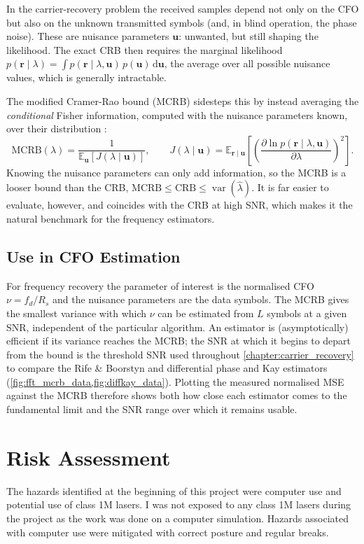 \documentclass[12pt,a4paper]{report}
\begin{document}
In the carrier-recovery problem the received samples depend not only on the CFO but also on the unknown transmitted symbols (and, in blind operation, the phase noise). These are nuisance parameters $\mathbf u$: unwanted, but still shaping the likelihood. The exact CRB then requires the marginal likelihood $p(\mathbf r\mid\lambda) = \int p(\mathbf r\mid\lambda,\mathbf u)\,p(\mathbf u)\,\mathrm d\mathbf u$, the average over all possible nuisance values, which is generally intractable.

The modified Cramer-Rao bound (MCRB) sidesteps this by instead averaging the \emph{conditional} Fisher information, computed with the nuisance parameters known, over their distribution \cite{Andrea1994}:
\begin{equation}
    \mathrm{MCRB}(\lambda) = \frac{1}{\mathbb E_{\mathbf u}\!\left[ J(\lambda\mid \mathbf u)\right]}, \qquad J(\lambda\mid\mathbf u) = \mathbb E_{\mathbf r\mid \mathbf u}\!\left[\left(\frac{\partial \ln p(\mathbf r\mid\lambda,\mathbf u)}{\partial\lambda}\right)^2\right].
\end{equation}
Knowing the nuisance parameters can only add information, so the MCRB is a looser bound than the CRB, $\mathrm{MCRB}\le\mathrm{CRB}\le\operatorname{var}(\hat\lambda)$. It is far easier to evaluate, however, and coincides with the CRB at high SNR, which makes it the natural benchmark for the frequency estimators.

\section{Use in CFO Estimation}
For frequency recovery the parameter of interest is the normalised CFO $\nu = f_d/R_s$ and the nuisance parameters are the data symbols. The MCRB gives the smallest variance with which $\nu$ can be estimated from $L$ symbols at a given SNR, independent of the particular algorithm. An estimator is (asymptotically) efficient if its variance reaches the MCRB; the SNR at which it begins to depart from the bound is the threshold SNR used throughout \cref{chapter:carrier_recovery} to compare the Rife \& Boorstyn and differential phase and Kay estimators (\cref{fig:fft_mcrb_data,fig:diffkay_data}). Plotting the measured normalised MSE against the MCRB therefore shows both how close each estimator comes to the fundamental limit and the SNR range over which it remains usable.


\chapter{Risk Assessment}\label{chapter:risk_assessment}
The hazards identified at the beginning of this project were computer use and potential use of class 1M lasers. I was not exposed to any class 1M lasers during the project as the work was done on a computer simulation. Hazards associated with computer use were mitigated with correct posture and regular breaks.
\end{document}
